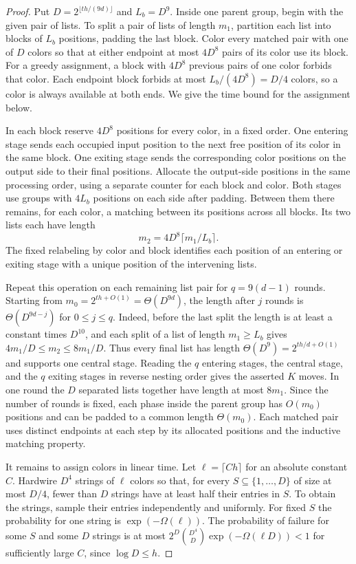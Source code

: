 \begin{proof}
Put $D=2^{\lfloor th/(9d)\rfloor}$ and $L_b=D^9$.  Inside one parent
group, begin with the given pair of lists.  To split a pair of lists of
length $m_1$, partition each list into blocks of $L_b$ positions, padding
the last block.  Color every matched pair with one of $D$ colors so that
at either endpoint at most $4D^8$ pairs of its color use its block.
For a greedy assignment, a block with $4D^8$ previous pairs of one color
forbids that color.  Each endpoint block forbids at most
$L_b/(4D^8)=D/4$ colors, so a color is always available at both ends.
We give the time bound for the assignment below.

In each block reserve $4D^8$ positions for every color, in a fixed order.
One entering stage sends each occupied input position to the next free
position of its color in the same block.  One exiting stage sends the
corresponding color positions on the output side to their final
positions.  Allocate the output-side positions in the same processing
order, using a separate counter for each block and color.  Both stages
use groups with $4L_b$ positions on each side after padding.  Between
them there remains, for each color, a matching between its positions
across all blocks.  Its two lists each have length
\[
        m_2=4D^8\lceil m_1/L_b\rceil.
\]
The fixed relabeling by color and block identifies each position of an
entering or exiting stage with a unique position of the intervening lists.

Repeat this operation on each remaining list pair for $q=9(d-1)$ rounds.
Starting from $m_0=2^{th+O(1)}=\Theta(D^{9d})$, the length after $j$
rounds is $\Theta(D^{9d-j})$ for $0\leq j\leq q$.  Indeed, before
the last split the length is at least a constant times $D^{10}$, and
each split of a list of length $m_1\geq L_b$ gives
$4m_1/D\leq m_2\leq8m_1/D$.  Thus every final list has length
$\Theta(D^9)=2^{th/d+O(1)}$ and supports one central stage.  Reading
the $q$ entering stages, the central stage, and the $q$ exiting stages
in reverse nesting order gives the asserted $K$ moves.  In one round
the $D$ separated lists together have length at most $8m_1$.  Since the
number of rounds is fixed, each phase inside the parent group has
$O(m_0)$ positions and can be padded to a common length
$\Theta(m_0)$.  Each matched pair uses distinct endpoints at each step
by its allocated positions and the inductive matching property.

It remains to assign colors in linear time.  Let $\ell=\lceil Ch\rceil$
for an absolute constant $C$.  Hardwire $D^4$ strings of $\ell$ colors
so that, for every $S\subseteq\{1,\ldots,D\}$ of size at most $D/4$,
fewer than $D$ strings have at least half their entries in $S$.
To obtain the strings, sample their entries independently and uniformly.
For fixed $S$ the probability for one string is $\exp(-\Omega(\ell))$.
The probability of failure for some $S$ and some $D$ strings is at most
$2^D\binom{D^4}{D}\exp(-\Omega(\ell D))<1$ for sufficiently large $C$,
since $\log D\leq h$.


\end{proof}
